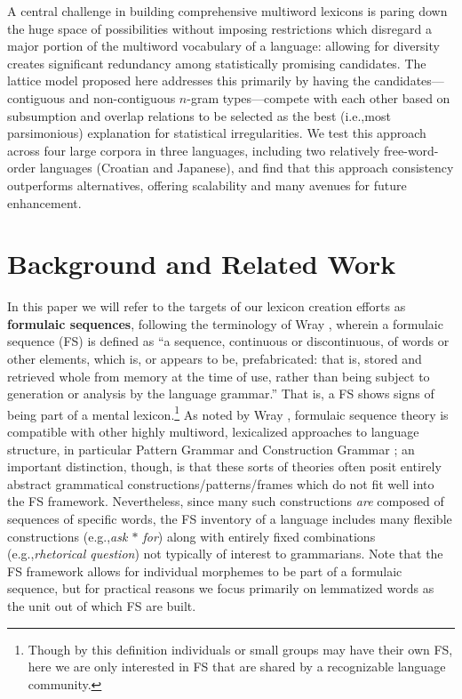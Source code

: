 \documentclass[11pt,letterpaper]{article}
\makeatletter
\def \eg {e.g.,\@ }
\def \ie {i.e.,\@ }
\newcommand{\gap}{$*$\xspace}
\newcommand{\ex}[1]{\textit{#1}\xspace}
\newcommand{\termdef}[1]{\textbf{#1}\xspace}
\makeatother
\begin{document}
A central challenge in building comprehensive multiword lexicons is paring down the huge space of possibilities without imposing restrictions which disregard a major portion of the multiword vocabulary of a language: allowing for diversity creates significant redundancy among statistically promising candidates. The lattice model proposed here addresses this primarily by having the candidates---contiguous and non-contiguous $n$-gram types---compete with each other based on subsumption and overlap relations to be selected as the best (\ie most parsimonious) explanation for statistical irregularities. We test this approach across four large corpora in three languages, including two relatively free-word-order languages (Croatian and Japanese), and find that this approach consistency outperforms alternatives, offering scalability and many avenues for future enhancement.




\section{Background and Related Work}

\label{sec:background}

In this paper we will refer to the targets of our lexicon creation efforts as \termdef{formulaic sequences}, following the terminology of Wray , wherein a formulaic sequence (FS) is defined as ``a sequence, continuous or discontinuous, of words or other elements, which is, or appears to be, prefabricated: that is, stored and retrieved whole from memory at the time of use, rather than being subject to generation or analysis by the language grammar.'' That is, a FS shows signs of being part of a mental lexicon.\footnote{Though by this definition individuals or small groups may have their own FS, here we are only interested in FS that are shared by a recognizable language community.} As noted by Wray ,  formulaic sequence theory is compatible with other highly multiword, lexicalized approaches to language structure, in particular Pattern Grammar \cite{PG} and Construction Grammar \cite{ConG}; an important distinction, though, is that these sorts of theories often posit entirely abstract grammatical constructions/patterns/frames which do not fit well into the FS framework. Nevertheless, since many such constructions \textit{are} composed of sequences of specific words, the FS inventory of a language includes many flexible constructions (\eg \ex{ask \gap for}) along with entirely fixed combinations (\eg \ex{rhetorical question}) not typically of interest to grammarians. Note that the FS framework allows for individual morphemes to be part of a formulaic sequence, but for practical reasons we focus primarily on lemmatized words as the unit out of which FS are built.
\end{document}
